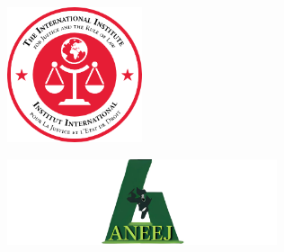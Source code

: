 \documentclass[
  letterpaper,
  DIV=11,
  numbers=noendperiod]{scrreprt}
\begin{document}
\begin{figure}
\begin{minipage}{0.50\linewidth}
\begin{figure}[H]
{}


\end{figure}%

\end{minipage}%
\newline
\begin{minipage}{0.50\linewidth}

\begin{figure}[H]

{\centering \includegraphics[width=1.5625in,height=1.5625in]{images/mous/iiji.png}

}


\end{figure}%

\end{minipage}%
%
\begin{minipage}{0.50\linewidth}

\begin{figure}[H]

{\centering \includegraphics[width=3.125in,height=\textheight,keepaspectratio]{images/mous/aneej.png}

}


\end{figure}%

\end{minipage}%
\newline
\begin{minipage}{0.50\linewidth}

\begin{figure}[H]


\end{figure}
\end{minipage}
\end{figure}
\end{document}

